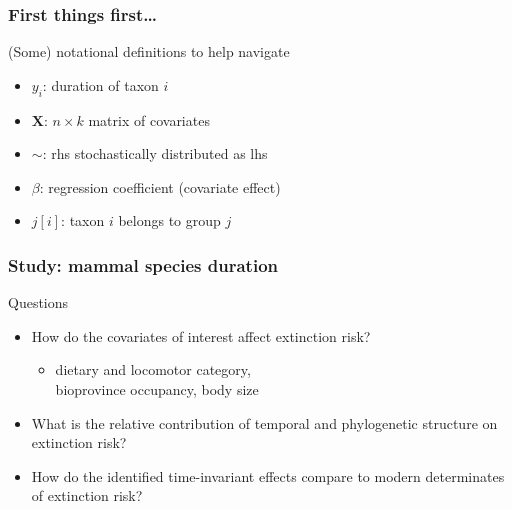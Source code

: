 \documentclass{beamer}
\begin{document}
\begin{frame}
  \frametitle{First things first\dots}

  \begin{block}{(Some) notational definitions to help navigate}
    \begin{itemize}
      \item \(y_{i}\): duration of taxon \(i\)
      \item \(\mathbf{X}\): \(n \times k\) matrix of covariates
      \item \(\sim\): rhs stochastically distributed as lhs
      \item \(\beta\): regression coefficient (covariate effect)
      \item \(j[i]\): taxon \(i\) belongs to group \(j\)
    \end{itemize}
  \end{block}
\end{frame}

\begin{frame}
  \frametitle{Study: mammal species duration}

  \begin{alertblock}{Questions}
    \begin{itemize}
      \item How do the covariates of interest affect extinction risk?
        \begin{itemize}
          \item dietary and locomotor category, \\bioprovince occupancy, body size
        \end{itemize}
      \item What is the relative contribution of temporal and phylogenetic structure on extinction risk?
      \item How do the identified time-invariant effects compare to modern determinates of extinction risk?
    \end{itemize}
  \end{alertblock}
\end{frame}
\end{document}
